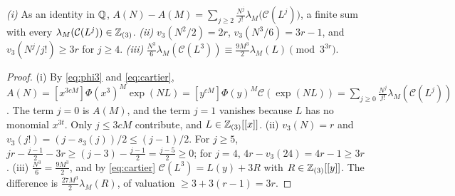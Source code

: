 \documentclass[11pt]{amsart}
\begin{document}
\begin{lemma}\label{lem:sizes}
\emph{(i)} As an identity in $\mathbb{Q}$, $A(N)-A(M)=\sum_{j\ge2}\frac{N^j}{j!}\lambda_M\bigl(\mathcal C(L^j)\bigr)$, a finite sum with every $\lambda_M(\mathcal C(L^j))\in\mathbb{Z}_{(3)}$.
\emph{(ii)} $v_3(N^2/2)=2r$, $v_3(N^3/6)=3r-1$, and $v_3(N^j/j!)\ge3r$ for $j\ge4$.
\emph{(iii)} $\frac{N^3}6\lambda_M(\mathcal C(L^3))\equiv\frac{9M^3}2\lambda_M(L)\pmod{3^{3r}}$.
\end{lemma}
\begin{proof}
(i) By \eqref{eq:phi3} and \eqref{eq:cartier}, $A(N)=[x^{3cM}]\Phi(x^3)^M\exp(NL)=[y^{cM}]\Phi(y)^M\mathcal C(\exp(NL))=\sum_{j\ge0}\frac{N^j}{j!}\lambda_M(\mathcal C(L^j))$. The term $j=0$ is $A(M)$, and the term $j=1$ vanishes because $L$ has no monomial $x^{3t}$. Only $j\le3cM$ contribute, and $L\in\mathbb{Z}_{(3)}[[x]]$.
(ii) $v_3(N)=r$ and $v_3(j!)=(j-s_3(j))/2\le(j-1)/2$. For $j\ge5$, $jr-\frac{j-1}2-3r\ge(j-3)-\frac{j-1}2=\frac{j-5}2\ge0$; for $j=4$, $4r-v_3(24)=4r-1\ge3r$.
(iii) $\frac{N^3}6=\frac{9M^3}2$, and by \eqref{eq:cartier} $\mathcal C(L^3)=L(y)+3R$ with $R\in\mathbb{Z}_{(3)}[[y]]$. The difference is $\frac{27M^3}2\lambda_M(R)$, of valuation $\ge3+3(r-1)=3r$.
\end{proof}
\end{document}

